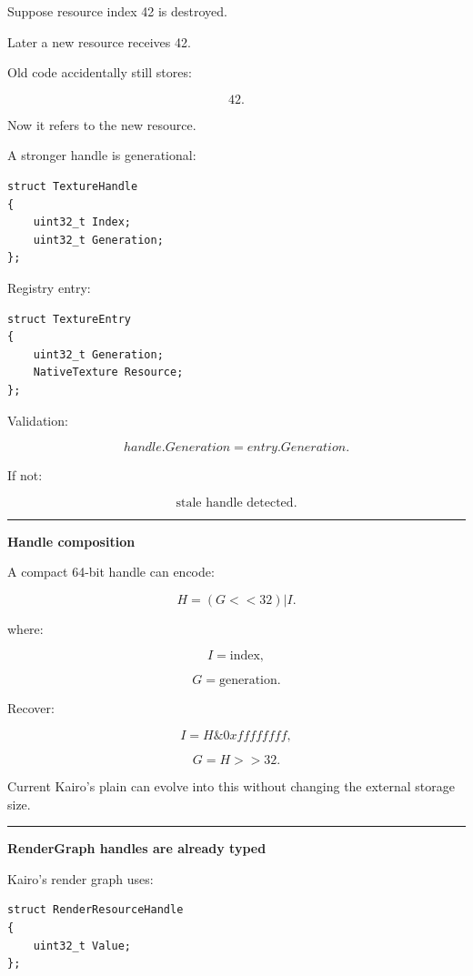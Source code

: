 Suppose resource index 42 is destroyed.

Later a new resource receives 42.

Old code accidentally still stores:

\[
42.
\]

Now it refers to the new resource.

A stronger handle is generational:

\begin{verbatim}
struct TextureHandle
{
    uint32_t Index;
    uint32_t Generation;
};
\end{verbatim}

Registry entry:

\begin{verbatim}
struct TextureEntry
{
    uint32_t Generation;
    NativeTexture Resource;
};
\end{verbatim}

Validation:

\[
handle.Generation
=
entry.Generation.
\]

If not:

\[
\boxed{\text{stale handle detected}.}
\]

\begin{center}\rule{0.5\linewidth}{0.5pt}\end{center}

\textbf{Handle composition}

A compact 64-bit handle can encode:

\[
H=
(G<<32)|I.
\]

where:

\[
I=\text{index},
\]

\[
G=\text{generation}.
\]

Recover:

\[
I=H\&0xffffffff,
\]

\[
G=H>>32.
\]

Current Kairo's plain  can evolve into this without changing the external storage size.

\begin{center}\rule{0.5\linewidth}{0.5pt}\end{center}

\textbf{RenderGraph handles are already typed}

Kairo's render graph uses:

\begin{verbatim}
struct RenderResourceHandle
{
    uint32_t Value;
};
\end{verbatim}

